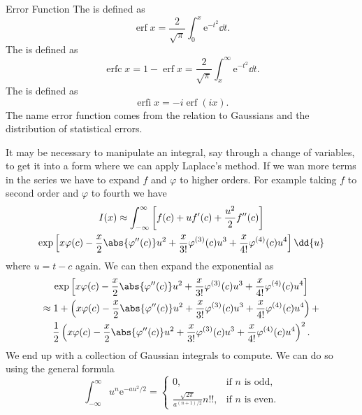 \documentclass[fleqn]{NotesClass}
\newcommand*{\e}{\mathrm{e}}
\DeclareMathOperator{\erf}{erf}
\DeclareMathOperator{\erfc}{erfc}
\DeclareMathOperator{\erfi}{erfi}
\begin{document}
    \begin{dfn}{Error Function}{}
        The  is defined as
        \begin{equation}
            \erf x = \frac{2}{\sqrt{\pi}} \int_0^x \e^{-t^2} \dd{t}.
        \end{equation}
        The  is defined as
        \begin{equation}
            \erfc x = 1 - \erf x = \frac{2}{\sqrt{\pi}} \int_x^{\infty} \e^{-t^2}\dd{t}.
        \end{equation}
        The  is defined as
        \begin{equation}
            \erfi x = -i\erf(ix).
        \end{equation}
        The name error function comes from the relation to Gaussians and the distribution of statistical errors.
    \end{dfn}
    
    It may be necessary to manipulate an integral, say through a change of variables, to get it into a form where we can apply Laplace's method.
    If we wan more terms in the series we have to expand \(f\) and \(\varphi\) to higher orders.
    For example taking \(f\) to second order and \(\varphi\) to fourth we have
    \begin{multline}
        I(x) \approx \int_{-\infty}^{\infty} \left[ f(c) + uf'(c) + \frac{u^2}{2}f''(c)\right] \\
        \exp\left[ x\varphi(c) - \frac{x}{2}\abs{\varphi''(c)}u^2 + \frac{x}{3!}\varphi^{(3)}(c)u^3 + \frac{x}{4!}\varphi^{(4)}(c)u^{4} \right] \dd{u}
    \end{multline}
    where \(u = t - c\) again.
    We can then expand the exponential as
    \begin{multline}
        \exp\left[ x\varphi(c) - \frac{x}{2}\abs{\varphi''(c)}u^2 + \frac{x}{3!}\varphi^{(3)}(c)u^3 + \frac{x}{4!}\varphi^{(4)}(c)u^{4} \right] \\
        \approx 1 + \left( x\varphi(c) - \frac{x}{2}\abs{\varphi''(c)}u^2 + \frac{x}{3!}\varphi^{(3)}(c)u^3 + \frac{x}{4!}\varphi^{(4)}(c)u^{4} \right) +\\
        \frac{1}{2}\left( x\varphi(c) - \frac{x}{2}\abs{\varphi''(c)}u^2 + \frac{x}{3!}\varphi^{(3)}(c)u^3 + \frac{x}{4!}\varphi^{(4)}(c)u^{4} \right)^2.
    \end{multline}
    We end up with a collection of Gaussian integrals to compute.
    We can do so using the general formula
    \begin{equation}
        \int_{-\infty}^{\infty} u^n\e^{-au^2/2} = 
        \begin{cases}
            0, & \text{if \(n\) is odd},\\
            \frac{\sqrt{2\pi}}{a^{(n+1)/2}} n!!, &\text{if \(n\) is even}.
        \end{cases}
    \end{equation}
    
\end{document}
